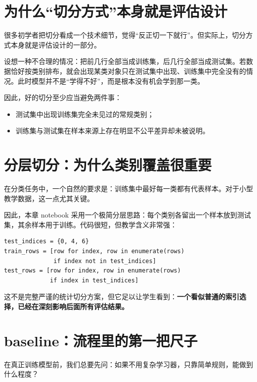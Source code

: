 \section{为什么“切分方式”本身就是评估设计}

很多初学者把切分看成一个技术细节，觉得“反正切一下就行”。但实际上，切分方式本身就是评估设计的一部分。

设想一种不合理的情况：把前几行全部当成训练集，后几行全部当成测试集。若数据恰好按类别排布，就会出现某类对象只在测试集中出现、训练集中完全没有的情况。此时模型并不是“学得不好”，而是根本没有机会学到那一类。

因此，好的切分至少应当避免两件事：

\begin{itemize}
    \item 测试集中出现训练集完全未见过的常规类别；
    \item 训练集与测试集在样本来源上存在明显不公平差异却未被说明。
\end{itemize}

\section{分层切分：为什么类别覆盖很重要}

在分类任务中，一个自然的要求是：训练集中最好每一类都有代表样本。对于小型教学数据，这一点尤其关键。

因此，本章 notebook 采用一个极简分层思路：每个类别各留出一个样本放到测试集，其余样本用于训练。代码很短，但教学含义非常强：

\begin{examplebox}[教学版分层切分]
\begin{lstlisting}[style=pythonstyle]
test_indices = {0, 4, 6}
train_rows = [row for index, row in enumerate(rows)
              if index not in test_indices]
test_rows = [row for index, row in enumerate(rows)
             if index in test_indices]
\end{lstlisting}
\end{examplebox}

这不是完整严谨的统计切分方案，但它足以让学生看到：\textbf{一个看似普通的索引选择，已经在深刻影响后面所有评估结果。}

\section{baseline：流程里的第一把尺子}

在真正训练模型前，我们总要先问：如果不用复杂学习器，只靠简单规则，能做到什么程度？

